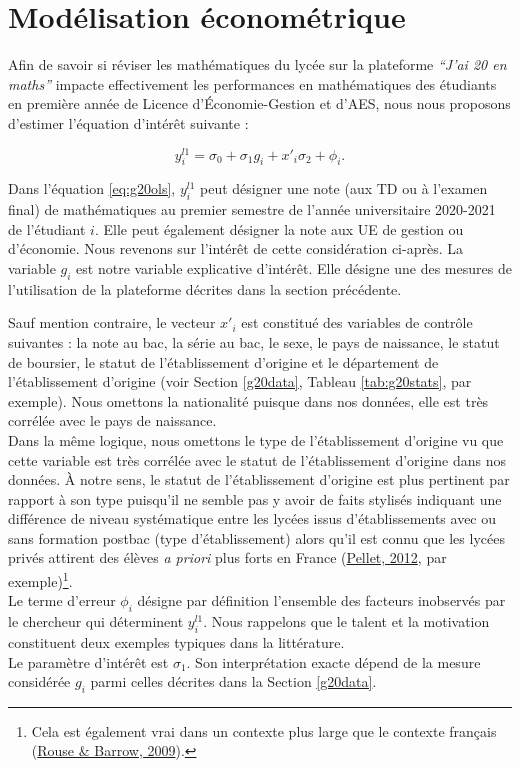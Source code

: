\documentclass[
]{book}
\begin{document}
\hypertarget{g20methods}{%
\section{Modélisation économétrique}\label{g20methods}}

Afin de savoir si réviser les mathématiques du lycée sur la plateforme \emph{``J'ai 20 en maths''} impacte effectivement les performances en mathématiques des étudiants en première année de Licence d'Économie-Gestion et d'AES, nous nous proposons d'estimer l'équation d'intérêt suivante :

\begin{equation}
\label{eq:g20ols}
y_i^{l1} = \sigma_0 + \sigma_1 g_i + x'_i \sigma_2 + \phi_i. 
\end{equation}

Dans l'équation \eqref{eq:g20ols}, \(y_i^{l1}\) peut désigner une note (aux TD ou à l'examen final) de mathématiques au premier semestre de l'année universitaire 2020-2021 de l'étudiant \(i\). Elle peut également désigner la note aux UE de gestion ou d'économie. Nous revenons sur l'intérêt de cette considération ci-après. La variable \(g_i\) est notre variable explicative d'intérêt. Elle désigne une des mesures de l'utilisation de la plateforme décrites dans la section précédente.

Sauf mention contraire, le vecteur \(x'_i\) est constitué des variables de contrôle suivantes : la note au bac, la série au bac, le sexe, le pays de naissance, le statut de boursier, le statut de l'établissement d'origine et le département de l'établissement d'origine (voir Section \ref{g20data}, Tableau \ref{tab:g20stats}, par exemple). Nous omettons la nationalité puisque dans nos données, elle est très corrélée avec le pays de naissance.\\
Dans la même logique, nous omettons le type de l'établissement d'origine vu que cette variable est très corrélée avec le statut de l'établissement d'origine dans nos données. À notre sens, le statut de l'établissement d'origine est plus pertinent par rapport à son type puisqu'il ne semble pas y avoir de faits stylisés indiquant une différence de niveau systématique entre les lycées issus d'établissements avec ou sans formation postbac (type d'établissement) alors qu'il est connu que les lycées privés attirent des élèves \emph{a priori} plus forts en France (\protect\hyperlink{ref-PEL:12}{Pellet, 2012}, par exemple)\footnote{Cela est également vrai dans un contexte plus large que le contexte français (\protect\hyperlink{ref-BAR:ROU:09}{Rouse \& Barrow, 2009}).}.\\
Le terme d'erreur \(\phi_i\) désigne par définition l'ensemble des facteurs inobservés par le chercheur qui déterminent \(y_i^{l1}\). Nous rappelons que le talent et la motivation constituent deux exemples typiques dans la littérature.\\
Le paramètre d'intérêt est \(\sigma_1\). Son interprétation exacte dépend de la mesure considérée \(g_i\) parmi celles décrites dans la Section \ref{g20data}.
\end{document}
